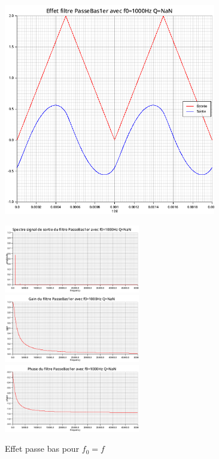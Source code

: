 \documentclass{article}
\begin{document}
\begin{figure}[H]
  \begin{minipage}{0.6\textwidth}
      \centering
      \includegraphics[width=25em]{images/triangulaire/bas/signals.png}
  \end{minipage}
  \begin{minipage}{0.3\textwidth}
      \centering
      \includegraphics[width=16em]{images/triangulaire/bas/fft_out.png}
      \vfill
      \includegraphics[width=16em]{images/triangulaire/bas/gain.png}
      \vfill
      \includegraphics[width=16em]{images/triangulaire/bas/phase.png}
  \end{minipage}
  \caption{Effet passe bas pour $f_0=f$}
\end{figure}
\end{document}
